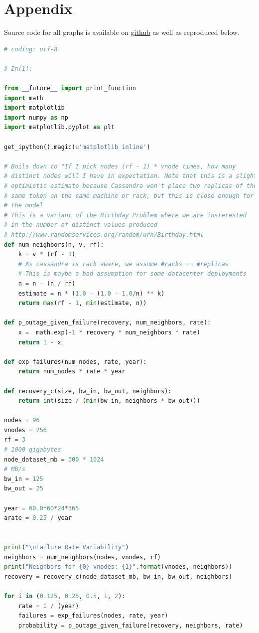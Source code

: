 \documentclass{article}
\begin{document}
\section{Appendix}

Source code for all graphs is available on \href{https://github.com/jolynch/python_performance_toolkit/blob/master/notebooks/cassandra_availability/cassandra_availability.ipynb}{github} as well as reproduced below.
\begin{lstlisting}[language=Python]
# coding: utf-8

# In[1]:

from __future__ import print_function
import math
import matplotlib
import numpy as np
import matplotlib.pyplot as plt

get_ipython().magic(u'matplotlib inline')

# Boils down to "If I pick nodes (rf - 1) * vnode times, how many
# distinct nodes will I have in expectation. Note that this is a slightly
# optimistic estimate because Cassandra won't place two replicas of the
# same token on the same machine or rack, but this is close enough for
# the model
# This is a variant of the Birthday Problem where we are insterested
# in the number of distinct values produced
# http://www.randomservices.org/random/urn/Birthday.html
def num_neighbors(n, v, rf):
    k = v * (rf - 1)
    # As cassandra is rack aware, we assume #racks == #replicas
    # This is maybe a bad assumption for some datacenter deployments
    n = n - (n / rf)
    estimate = n * (1.0 - (1.0 - 1.0/n) ** k)
    return max(rf - 1, min(estimate, n))

def p_outage_given_failure(recovery, num_neighbors, rate):
    x =  math.exp(-1 * recovery * num_neighbors * rate)
    return 1 - x

def exp_failures(num_nodes, rate, year):
    return num_nodes * rate * year

def recovery_c(size, bw_in, bw_out, neighbors):
    return int(size / (min(bw_in, neighbors * bw_out)))

nodes = 96
vnodes = 256
rf = 3
# 1000 gigabytes
node_dataset_mb = 300 * 1024
# MB/s
bw_in = 125
bw_out = 25

year = 60.0*60*24*365
arate = 0.25 / year


print("\nFailure Rate Variability")
neighbors = num_neighbors(nodes, vnodes, rf)
print("Neighbors for {0} vnodes: {1}".format(vnodes, neighbors))
recovery = recovery_c(node_dataset_mb, bw_in, bw_out, neighbors)

for i in (0.125, 0.25, 0.5, 1, 2):
    rate = i / (year)
    failures = exp_failures(nodes, rate, year)
    probability = p_outage_given_failure(recovery, neighbors, rate)


\end{lstlisting}
\end{document}
